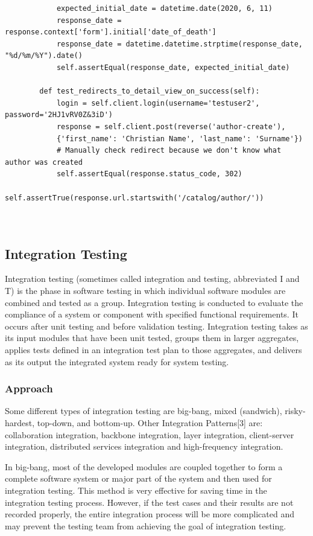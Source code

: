 \documentclass[12pt, a4paper]{report}
\begin{document}
\begin{lstlisting}
			expected_initial_date = datetime.date(2020, 6, 11)
			response_date = response.context['form'].initial['date_of_death']
			response_date = datetime.datetime.strptime(response_date, "%d/%m/%Y").date()
			self.assertEqual(response_date, expected_initial_date)
	
		def test_redirects_to_detail_view_on_success(self):
			login = self.client.login(username='testuser2', password='2HJ1vRV0Z&3iD')
			response = self.client.post(reverse('author-create'),
			{'first_name': 'Christian Name', 'last_name': 'Surname'})
			# Manually check redirect because we don't know what author was created
			self.assertEqual(response.status_code, 302)
			self.assertTrue(response.url.startswith('/catalog/author/'))
	
	
\end{lstlisting}

\newpage
\subsection{Integration Testing}

Integration testing (sometimes called integration and testing, abbreviated I and T) is the phase in software testing in which individual software modules are combined and tested as a group. Integration testing is conducted to evaluate the compliance of a system or component with specified functional requirements. It occurs after unit testing and before validation testing. Integration testing takes as its input modules that have been unit tested, groups them in larger aggregates, applies tests defined in an integration test plan to those aggregates, and delivers as its output the integrated system ready for system testing.

\subsubsection{Approach}
Some different types of integration testing are big-bang, mixed (sandwich), risky-hardest, top-down, and bottom-up. Other Integration Patterns[3] are: collaboration integration, backbone integration, layer integration, client-server integration, distributed services integration and high-frequency integration.

In big-bang, most of the developed modules are coupled together to form a complete software system or major part of the system and then used for integration testing. This method is very effective for saving time in the integration testing process. However, if the test cases and their results are not recorded properly, the entire integration process will be more complicated and may prevent the testing team from achieving the goal of integration testing.
\end{document}
